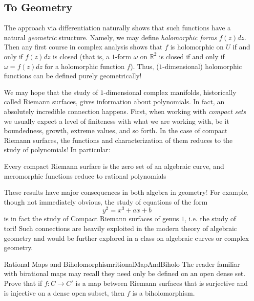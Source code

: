 \documentclass{article}
\newcommand{\R}{\mathbb{R}}
\begin{document}
\subsection{To Geometry}

The approach via differentiation naturally shows that such functions have a
natural \emph{geometric} structure. Namely, we may define \emph{holomorphic forms} $f(z)dz$. Then any first
course in complex analysis shows that $f$ is holomorphic on $U$ if and only if $f(z)dz$ is closed (that is, a
$1$-form $\omega$ on $\R^2$ is closed if and only if $\omega = f(z)dz$ for a holomorphic function $f$). Thus,
($1$-dimensional) holomorphic functions can be defined purely geometrically!

We may hope that the study of $1$-dimensional complex manifolds, historically called Riemann surfaces, gives information
about polynomials. In fact, an absolutely incredible connection happens. First, when working with
\emph{compact sets} we usually expect a level of finiteness with what we are working with, be it boundedness,
growth, extreme values, and so forth. In the case of compact Riemann surfaces, the functions and
characterization of them reduces to the study of polynomials! In particular:

\begin{center}
    \addtolength{\leftskip}{2cm}  %
    \addtolength{\rightskip}{2cm} %
  Every compact Riemann surface is the zero set of an algebraic curve, and meromorphic functions reduce to
  rational polynomials
\end{center}

These results have major consequences in both algebra in geometry! For example, though not immediately
obvious, the study of equations of the form
\[
  y^2 = x^3 + ax + b
\]
is in fact the study of Compact Riemann surfaces of genus $1$, i.e. the study of tori! Such connections are
heavily exploited in the modern theory of algebraic geometry and would be further explored in a class on
algebraic curves or complex geometry.

\begin{example}{Rational Maps and Biholomorphism}{ritionalMapAndBiholo}
  The reader familiar with birational maps may recall they need only be defined on an open dense set. Prove
  that if $f: C \to C'$ is a map between Riemann surfaces that is surjective and is injective on a dense open
  subset, then $f$ is a biholomorphism.
\end{example}
\end{document}
